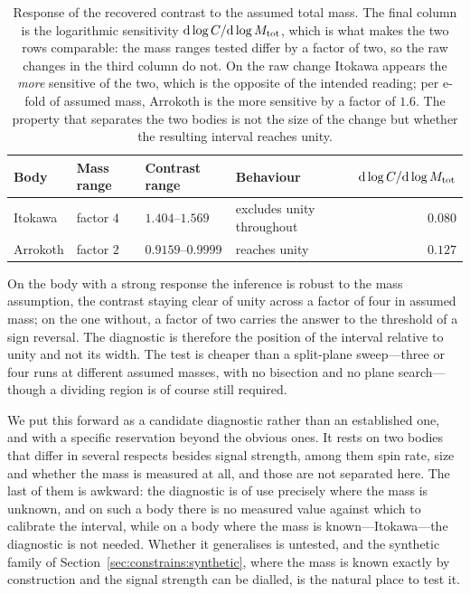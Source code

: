 \begin{table}[htbp]
\centering
\small
\caption{Response of the recovered contrast to the assumed total mass. The
final column is the logarithmic sensitivity
$\mathrm{d}\log C/\mathrm{d}\log M_{\mathrm{tot}}$, which is what makes the two rows
comparable: the mass ranges tested differ by a factor of two, so the raw
changes in the third column do not. On the raw change Itokawa appears the
\emph{more} sensitive of the two, which is the opposite of the intended
reading; per e-fold of assumed mass, Arrokoth is the more sensitive by a
factor of $1.6$. The property that separates the two bodies is not the size
of the change but whether the resulting interval reaches unity.}
\label{tab:massdiag}
\begin{tabular}{llllr}
\toprule
Body & Mass range & Contrast range & Behaviour
 & $\mathrm{d}\log C/\mathrm{d}\log M_{\mathrm{tot}}$ \\
\midrule
Itokawa  & factor $4$ & $1.404$--$1.569$ & excludes unity throughout
 & $0.080$ \\
Arrokoth & factor $2$ & $0.9159$--$0.9999$ & reaches unity
 & $0.127$ \\
\bottomrule
\end{tabular}
\end{table}

On the body with a strong response the inference is robust to the mass
assumption, the contrast staying clear of unity across a factor of four in
assumed mass; on the one without, a factor of two carries the answer to the
threshold of a sign reversal. The diagnostic is therefore the position of
the interval relative to unity and not its width. The test is cheaper than a
split-plane sweep---three or four runs at different assumed masses, with no
bisection and no plane search---though a dividing region is of course still
required.

We put this forward as a candidate diagnostic rather than an established
one, and with a specific reservation beyond the obvious ones. It rests on
two bodies that differ in several respects besides signal strength, among
them spin rate, size and whether the mass is measured at all, and those are
not separated here. The last of them is awkward: the diagnostic is of use
precisely where the mass is unknown, and on such a body there is no measured
value against which to calibrate the interval, while on a body where the
mass is known---Itokawa---the diagnostic is not needed. Whether it
generalises is untested, and the synthetic family of
Section~\ref{sec:constrains:synthetic}, where the mass is known exactly by
construction and the signal strength can be dialled, is the natural place to
test it.
